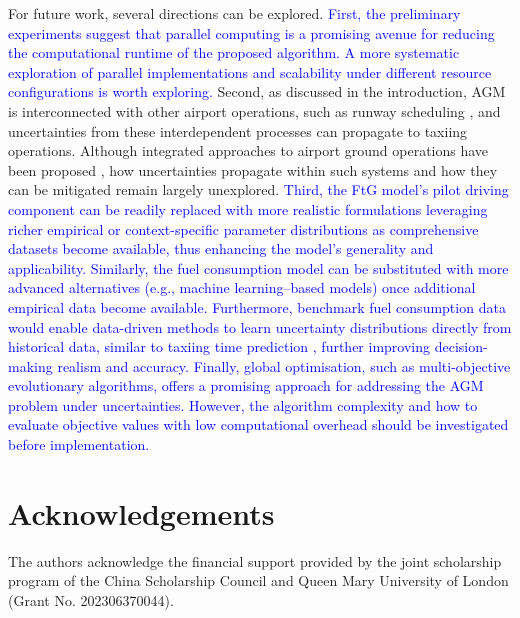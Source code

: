 \documentclass{article}
\newcommand*{\blue}{\textcolor{blue}}
\begin{document}
For future work, several directions can be explored. \blue{First, the preliminary experiments suggest that parallel computing is a promising avenue for reducing the computational runtime of the proposed algorithm. A more systematic exploration of parallel implementations and scalability under different resource configurations is worth exploring.} Second, as discussed in the introduction, AGM is interconnected with other airport operations, such as runway scheduling \cite{ikli_aircraft_2021}, and uncertainties from these interdependent processes can propagate to taxiing operations. Although integrated approaches to airport ground operations have been proposed \cite{weiszer2015integrated}, how uncertainties propagate within such systems and how they can be mitigated remain largely unexplored. \blue{Third, the FtG model's pilot driving component can be readily replaced with more realistic formulations leveraging richer empirical or context-specific parameter distributions as comprehensive datasets become available, thus enhancing the model’s generality and applicability. Similarly, the fuel consumption model can be substituted with more advanced alternatives (e.g., machine learning–based models) once additional empirical data become available. Furthermore, benchmark fuel consumption data would enable data-driven methods to learn uncertainty distributions directly from historical data, similar to taxiing time prediction \cite{wang2021aircraft}, further improving decision-making realism and accuracy. Finally, global optimisation, such as multi-objective evolutionary algorithms, offers a promising approach for addressing the AGM problem under uncertainties. However, the algorithm complexity and how to evaluate objective values with low computational overhead should be investigated before implementation.}
\section{Acknowledgements}
The authors acknowledge the financial support provided by the joint scholarship program of the China Scholarship Council and Queen Mary University of London (Grant No. 202306370044).

\clearpage

\end{document}
